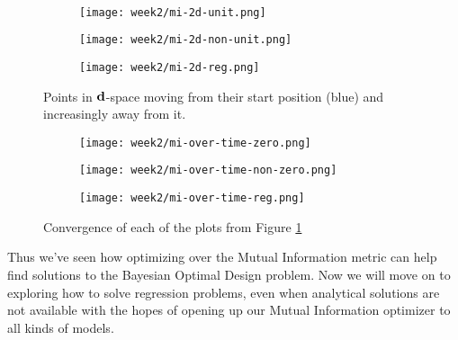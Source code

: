 \\
\begin{figure}
  \centering
  \begin{subfigure}{.5\textwidth}
    \texttt{[image: week2/mi-2d-unit.png]}
  \end{subfigure}%
  \begin{subfigure}{.5\textwidth}
    \texttt{[image: week2/mi-2d-non-unit.png]}
  \end{subfigure}
  \begin{subfigure}{.5\textwidth}
    \texttt{[image: week2/mi-2d-reg.png]}
  \end{subfigure}
  \centering
  \caption{Points in $\mathbf{d}$-space moving from their start position (blue) and increasingly away from it.}
  \label{fig:mi-2d}
\end{figure}
\begin{figure}
  \centering
  \begin{subfigure}{.5\textwidth}
    \texttt{[image: week2/mi-over-time-zero.png]}
  \end{subfigure}%
  \begin{subfigure}{.5\textwidth}
    \texttt{[image: week2/mi-over-time-non-zero.png]}
  \end{subfigure}
  \begin{subfigure}{.5\textwidth}
    \texttt{[image: week2/mi-over-time-reg.png]}
  \end{subfigure}
  \centering
  \caption{Convergence of each of the plots from Figure \ref{fig:mi-2d}}
  \label{fig:mi-over-time}
\end{figure}
Thus we've seen how optimizing over the Mutual Information metric can help find solutions to the Bayesian Optimal Design problem.
Now we will move on to exploring how to solve regression problems, even when analytical solutions are not available with the hopes of opening up our Mutual Information optimizer to all kinds of models.

